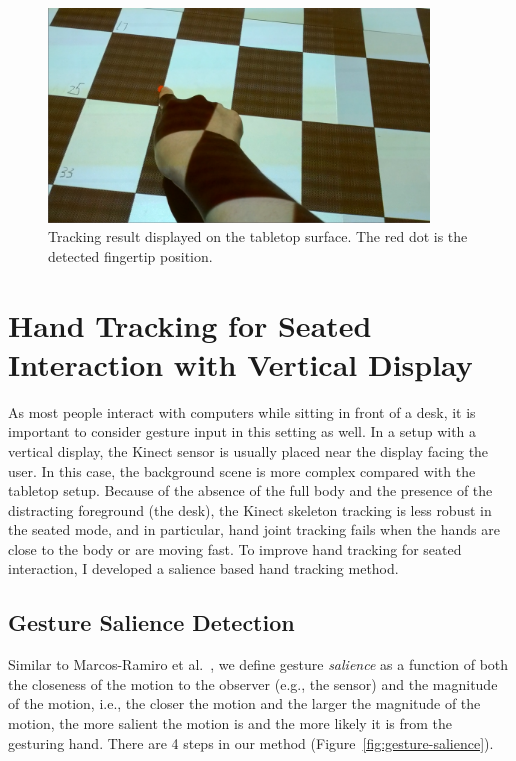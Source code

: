 \begin{figure}[tbh]
\centering
\includegraphics[width=0.9\textwidth]{figures/checkerboard.PNG}
\caption{Tracking result displayed on the tabletop surface. The red dot is the
detected fingertip position.}
\label{fig:checkerboard}
\end{figure}

\section{Hand Tracking for Seated Interaction with Vertical Display}
As most people interact with computers while sitting in front of
a desk, it is important to consider gesture input in this setting as
well. In a setup with a vertical display, the Kinect sensor is usually placed
near the display facing the user. In this case, the background scene is more
complex compared with the tabletop setup. Because of the absence of the full body and the
presence of the distracting foreground (the desk), the Kinect skeleton
tracking is less robust in the seated mode, and in particular, hand joint
tracking fails when the hands are close to the body or are moving fast.
To improve hand tracking for seated interaction, I developed a salience based
hand tracking method.

\subsection{Gesture Salience Detection}
Similar to Marcos-Ramiro et al.~\cite{marcos2013}, we define gesture
\textit{salience} as a function of both the closeness of the motion to the
observer (e.g., the sensor) and the magnitude of the motion, i.e., the closer
the motion and the larger the magnitude of the motion, the more salient the
motion is and the more likely it is from the gesturing hand. There are 4 steps
in our method (Figure~\ref{fig:gesture-salience}).

